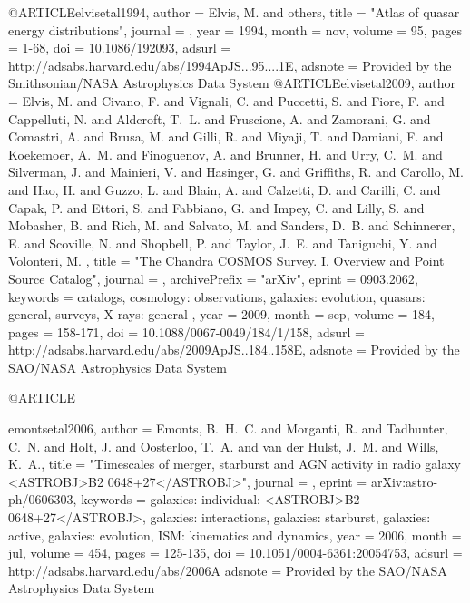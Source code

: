 {{{{{{{{{{{{{{{@ARTICLE{elvisetal1994,
   author = {{Elvis}, M. and others},
    title = "{Atlas of quasar energy distributions}",
  journal = {\apjs},
     year = 1994,
    month = nov,
   volume = 95,
    pages = {1-68},
      doi = {10.1086/192093},
   adsurl = {http://adsabs.harvard.edu/abs/1994ApJS...95....1E},
  adsnote = {Provided by the Smithsonian/NASA Astrophysics Data System}
}
@ARTICLE{elvisetal2009,
   author = {{Elvis}, M. and {Civano}, F. and {Vignali}, C. and {Puccetti}, S. and 
	{Fiore}, F. and {Cappelluti}, N. and {Aldcroft}, T.~L. and {Fruscione}, A. and 
	{Zamorani}, G. and {Comastri}, A. and {Brusa}, M. and {Gilli}, R. and 
	{Miyaji}, T. and {Damiani}, F. and {Koekemoer}, A.~M. and {Finoguenov}, A. and 
	{Brunner}, H. and {Urry}, C.~M. and {Silverman}, J. and {Mainieri}, V. and 
	{Hasinger}, G. and {Griffiths}, R. and {Carollo}, M. and {Hao}, H. and 
	{Guzzo}, L. and {Blain}, A. and {Calzetti}, D. and {Carilli}, C. and 
	{Capak}, P. and {Ettori}, S. and {Fabbiano}, G. and {Impey}, C. and 
	{Lilly}, S. and {Mobasher}, B. and {Rich}, M. and {Salvato}, M. and 
	{Sanders}, D.~B. and {Schinnerer}, E. and {Scoville}, N. and 
	{Shopbell}, P. and {Taylor}, J.~E. and {Taniguchi}, Y. and {Volonteri}, M.
	},
    title = "{The Chandra COSMOS Survey. I. Overview and Point Source Catalog}",
  journal = {\apjs},
archivePrefix = "arXiv",
   eprint = {0903.2062},
 keywords = {catalogs, cosmology: observations, galaxies: evolution, quasars: general, surveys, X-rays: general },
     year = 2009,
    month = sep,
   volume = 184,
    pages = {158-171},
      doi = {10.1088/0067-0049/184/1/158},
   adsurl = {http://adsabs.harvard.edu/abs/2009ApJS..184..158E},
  adsnote = {Provided by the SAO/NASA Astrophysics Data System}
}

@ARTICLE{emontsetal2006,
   author = {{Emonts}, B.~H.~C. and {Morganti}, R. and {Tadhunter}, C.~N. and 
	{Holt}, J. and {Oosterloo}, T.~A. and {van der Hulst}, J.~M. and 
	{Wills}, K.~A.},
    title = "{Timescales of merger, starburst and AGN activity in radio galaxy <ASTROBJ>B2 0648+27</ASTROBJ>}",
  journal = {\aap},
   eprint = {arXiv:astro-ph/0606303},
 keywords = {galaxies: individual: <ASTROBJ>B2 0648+27</ASTROBJ>, galaxies: interactions, galaxies: starburst, galaxies: active, galaxies: evolution, ISM: kinematics and dynamics},
     year = 2006,
    month = jul,
   volume = 454,
    pages = {125-135},
      doi = {10.1051/0004-6361:20054753},
   adsurl = {http://adsabs.harvard.edu/abs/2006A%
  adsnote = {Provided by the SAO/NASA Astrophysics Data System}
}


}}}}}}}}}}}}}}}}
